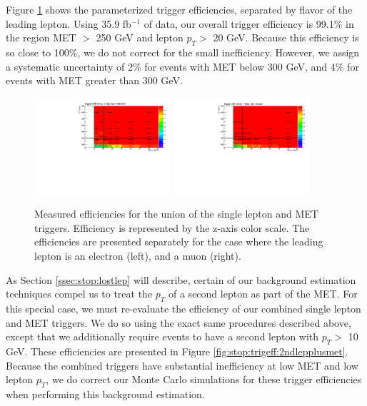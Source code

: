 Figure \ref{fig:stop:trigeff:1lepmet} shows the parameterized trigger
efficiencies, separated by flavor of the leading lepton. Using 35.9 fb$^{-1}$
of data, our overall trigger efficiency is 99.1\% in the region MET $>$
250 GeV and lepton $p_T >$ 20 GeV. Because this efficiency is so close
to 100\%, we do not correct for the small inefficiency. However, we
assign a systematic uncertainty of 2\% for events with MET below 300
GeV, and 4\% for events with MET greater than 300 GeV.

\begin{figure}[htb]
\centering
\includegraphics[width=0.45\textwidth]{figures/TriggerEff_el.pdf}
\includegraphics[width=0.45\textwidth]{figures/TriggerEff_mu.pdf}
\caption{Measured efficiencies for the union of the single lepton and
  MET triggers. Efficiency is represented by the z-axis color scale. The
  efficiencies are presented separately for the case where the leading
  lepton is an electron (left), and a muon (right).}
\label{fig:stop:trigeff:1lepmet}
\end{figure}

As Section \ref{ssec:stop:lostlep} will describe, certain of our
background estimation techniques compel us to treat the $p_T$ of a
second lepton as part of the MET. For this special case, we must
re-evaluate the efficiency of our combined single lepton and MET
triggers. We do so using the exact same procedures described above,
except that we additionally require events to have a second lepton
with $p_T >$ 10 GeV. These efficiencies are presented in Figure
\ref{fig:stop:trigeff:2ndlepplusmet}. Because the combined triggers
have substantial inefficiency at low MET and low lepton $p_T$, we
do correct our Monte Carlo simulations for these trigger
efficiencies when performing this background estimation.

